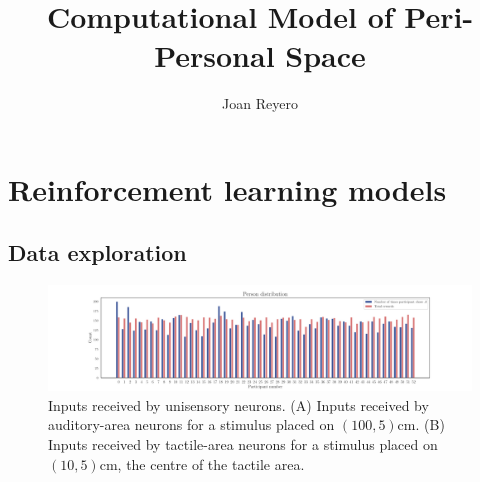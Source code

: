 \documentclass[12pt]{article}
\title{Computational Model of Peri-Personal Space}
\author{Joan Reyero}
\begin{document}
\maketitle

\section{Reinforcement learning models}

\subsection{Data exploration}


\begin{figure}[h!]
	\centering
	\hspace*{-0.6in}
	\includegraphics[width=1.2\linewidth]{figures/2.1.pdf}
	\caption{Inputs received by unisensory neurons. (A) Inputs received by auditory-area neurons for a stimulus placed on $(100,5)$cm. (B) Inputs received by tactile-area neurons for a stimulus placed on $(10,5)$cm, the centre of the tactile area.}
	\label{fig:3.1}
\end{figure}


\end{document}
